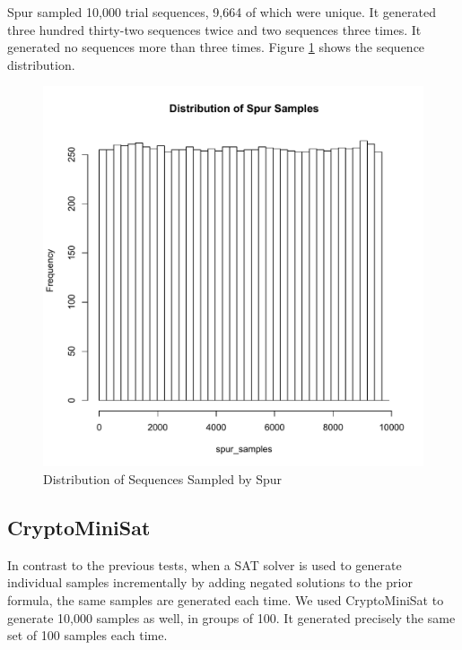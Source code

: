 
Spur sampled 10,000 trial sequences, 9,664 of which were unique. It generated three hundred thirty-two sequences twice and two sequences three times. It generated no sequences more than three times. Figure \ref{fig:spur_samples} shows the sequence distribution.

\begin{figure}[t]
\centering
\centerline{\includegraphics[origin=c,width=12cm]{../figures/spur-samples.pdf}}
\caption{Distribution of Sequences Sampled by Spur}
\label{fig:spur_samples}
\end{figure}

\subsection{CryptoMiniSat}

In contrast to the previous tests, when a SAT solver is used to generate individual samples incrementally by adding negated solutions to the prior formula, the same samples are generated each time. We used CryptoMiniSat to generate 10,000 samples as well, in groups of 100. It generated precisely the same set of 100 samples each time.


